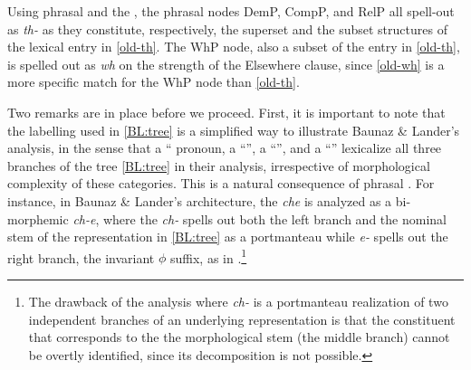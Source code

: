 \noindent Using phrasal  and the , the phrasal nodes DemP, CompP, and RelP all spell-out as \textit{th-} as they constitute, respectively, the superset and the subset structures of the lexical entry in \ref{old-th}. The WhP node, also a subset of the entry in \ref{old-th}, is spelled out as \textit{wh} on the strength of the Elsewhere clause, since \ref{old-wh} is a more specific match for the WhP node than \ref{old-th}. 
\par
Two remarks are in place before we proceed. First, it is important to note that the labelling used in \ref{BL:tree} is a simplified way to illustrate Baunaz \& Lander's analysis, in the sense that a `` pronoun,  a ``'', a ``'', and a ``'' lexicalize all three branches of the tree \ref{BL:tree} in their analysis, irrespective of morphological complexity of these categories. This is a natural consequence of phrasal . For instance, in Baunaz \& Lander's architecture, the  \textit{che} is analyzed as a bi-morphemic \textit{ch-e}, where the \textit{ch-}  spells out both the left branch and the nominal stem of the representation in \ref{BL:tree} as a portmanteau while \textit{e-} spells out the right branch, the invariant $\phi$ suffix, as in \Next.\footnote{The drawback of the analysis where \textit{ch-} is a portmanteau realization of two independent branches of an underlying representation is that the constituent that corresponds to the the morphological stem (the middle branch) cannot be overtly identi­fied, since its decomposition is not possible.
}%

